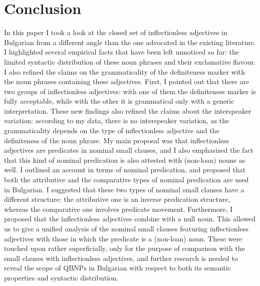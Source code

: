 \documentclass[output=paper]{langscibook}
\begin{document}



\section{Conclusion}\label{ge-sec-concl}

In this paper I took a look at the closed set of inflectionless adjectives in Bulgarian from a different angle than the one advocated in the existing literature. I highlighted several empirical facts that have been left unnoticed so far: the limited syntactic distribution of these noun phrases and their exclamative flavour. I also refined the claims on the grammaticality of the definiteness marker with the noun phrases containing these adjectives. First, I pointed out that there are two groups of inflectionless adjectives: with one of them the definiteness marker is fully acceptable, while with the other it is grammatical only with a generic interpretation. These new findings also refined the claims about the interspeaker variation: according to my data, there is no interspeaker variation, as the grammaticality depends on the type of inflectionless adjective and the definiteness of the noun phrase. My main proposal was that inflectionless adjectives are predicates in nominal small clauses, and I also emphasized the fact that this kind of nominal predication is also attested with (non-loan) nouns as well. I outlined an account in terms of nominal predication, and proposed that both the attributive and the comparative types of nominal predication are used in Bulgarian. I suggested that these two types of nominal small clauses have a different structure: the attributive one is an inverse predication structure, whereas the comparative one involves predicate movement. Furthermore, I proposed that the inflectionless adjectives combine with a null noun. This allowed us to give a unified analysis of the nominal small clauses featuring inflectionless adjectives with those in which the predicate is a (non-loan) noun. These were touched upon rather superficially, only for the purpose of comparison with the small clauses with inflectionless adjectives, and further research is needed to reveal the scope of QBNPs in Bulgarian with respect to both its semantic properties and syntactic distribution.

\end{document}
